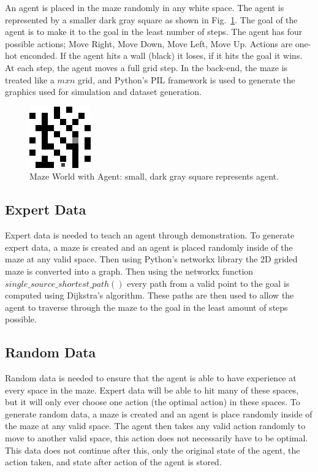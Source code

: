 \documentclass[12pt,american]{report}
\providecommand{\DIFaddtex}[1]{{\protect\color{blue}\uwave{#1}}} %
\providecommand{\DIFdeltex}[1]{{\protect\color{red}\sout{#1}}}                      %
\providecommand{\DIFaddbegin}{} %
\providecommand{\DIFaddend}{} %
\providecommand{\DIFdelbegin}{} %
\providecommand{\DIFdelend}{} %
\providecommand{\DIFadd}[1]{\texorpdfstring{\DIFaddtex{#1}}{#1}} %
\providecommand{\DIFdel}[1]{\texorpdfstring{\DIFdeltex{#1}}{}} %
\newcommand{\DIFscaledelfig}{0.5}
\newlength{\DIFdelgraphicswidth} %
\newlength{\DIFdelgraphicsheight} %
\newcommand{\DIFaddincludegraphics}[2][]{{\color{blue}\fbox{\DIFOincludegraphics[#1]{#2}}}} %
\newcommand{\DIFdelincludegraphics}[2][]{%
\sbox{\DIFdelgraphicsbox}{\DIFOincludegraphics[#1]{#2}}%
\settoboxwidth{\DIFdelgraphicswidth}{\DIFdelgraphicsbox} %
\settoboxtotalheight{\DIFdelgraphicsheight}{\DIFdelgraphicsbox} %
\scalebox{\DIFscaledelfig}{%
\parbox[b]{\DIFdelgraphicswidth}{\usebox{\DIFdelgraphicsbox}\\[-\baselineskip] \rule{\DIFdelgraphicswidth}{0em}}\llap{\resizebox{\DIFdelgraphicswidth}{\DIFdelgraphicsheight}{%
\setlength{\unitlength}{\DIFdelgraphicswidth}%
\begin{picture}(1,1)%
\thicklines\linethickness{2pt} %
{\color[rgb]{1,0,0}\put(0,0){\framebox(1,1){}}}%
{\color[rgb]{1,0,0}\put(0,0){\line( 1,1){1}}}%
{\color[rgb]{1,0,0}\put(0,1){\line(1,-1){1}}}%
\end{picture}%
}\hspace*{3pt}}} %
} %
\DeclareRobustCommand{\DIFaddbegin}{\DIFOaddbegin \let\includegraphics\DIFaddincludegraphics} %
\DeclareRobustCommand{\DIFaddend}{\DIFOaddend \let\includegraphics\DIFOincludegraphics} %
\DeclareRobustCommand{\DIFdelbegin}{\DIFOdelbegin \let\includegraphics\DIFdelincludegraphics} %
\DeclareRobustCommand{\DIFdelend}{\DIFOaddend \let\includegraphics\DIFOincludegraphics} %
\begin{document}
An agent is placed in the maze randomly in any white space.  The agent is represented by a smaller dark gray square as shown in Fig.~\ref{fig:maze_with_agent}. The goal of the agent is to make it to the goal in the least number of steps.  The agent has four possible actions; Move Right, Move Down, Move Left, Move Up. Actions are one-hot enconded. If the agent hits a wall (black) it loses, if it hits the goal it wins. At each step, the agent moves a full grid step.  In the back-end, the maze is treated like a \DIFdelbegin \DIFdel{$m x n$ }\DIFdelend \DIFaddbegin \DIFadd{$m\times n$ }\DIFaddend grid, and Python's PIL framework is used to generate the graphics used for simulation and dataset generation.
\begin{figure}
\centering
\includegraphics[scale=1.5]{images/maze_with_agent.jpg}
\caption{Maze World with Agent: small, dark gray square represents agent.}
\label{fig:maze_with_agent}
\end{figure}

\subsection{Expert Data}
Expert data is needed to teach an agent through demonstration.  To generate expert data, a maze is created and an agent is placed randomly inside of the maze at any valid space. Then using Python's networkx library the 2D grided maze is converted into a graph.  Then using the networkx function $single\_source\_shortest\_path()$ every path from a valid point to the goal is computed using Dijkstra's algorithm. These paths are then used to allow the agent to traverse through the maze to the goal in the least amount of steps possible.

\subsection{Random Data}
\label{sec:random_data}
Random data is needed to ensure that the agent is able to have experience at every space in the maze.  Expert data will be able to hit many of these spaces, but it will only ever choose one action (the optimal action) in these spaces. To generate random data, a maze is created and an agent is place randomly inside of the maze at any valid space.  The agent then takes any valid action randomly to move to another valid space, this action does not necessarily have to be optimal. This data does not continue after this, only the original state of the agent, the action taken, and state after action of the agent is stored.
\end{document}
